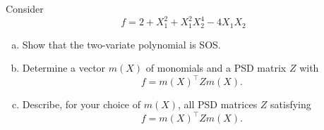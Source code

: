 \begin{exercise}
	Consider 
	\[
	f = 2 + X_1^2 + X_1^2 X_2^4 - 4 X_1 X_2 
	\]
	\begin{enumerate}[(a)]	
		\item Show that the two-variate polynomial is SOS. 
		\item Determine a vector $m(X)$ of monomials and a PSD matrix $Z$ with 
		\[
			f=m(X)^\top Z m(X). 
		\]
		\item Describe, for your choice of $m(X)$, all PSD matrices $Z$ satisfying 
		\[
		f=m(X)^\top Z m(X).
		\]
	\end{enumerate}
\end{exercise}
	
	
